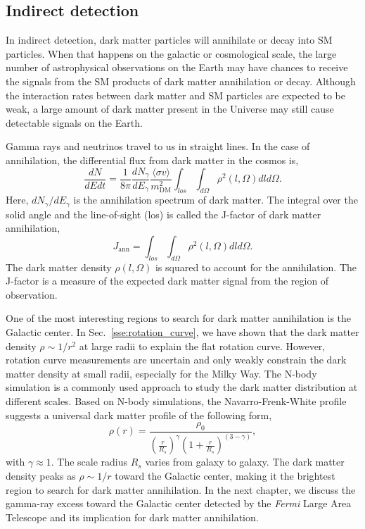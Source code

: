 \documentclass[doublespace,nopageskip]{VTthesis} %
\newcommand{\sigmav}{\langle\sigma v\rangle}
\begin{document}
\subsection{Indirect detection}\label{sse:indirect}

In indirect detection, dark matter particles will annihilate or decay into SM particles. When that happens on the galactic or cosmological scale, the large number of astrophysical observations on the Earth may have chances to receive the signals from the SM products of dark matter annihilation or decay. Although the interaction rates between dark matter and SM particles are expected to be weak, a large amount of dark matter present in the Universe may still cause detectable signals on the Earth.

Gamma rays and neutrinos travel to us in straight lines. In the case of annihilation, the differential flux from dark matter in the cosmos is,
\begin{equation}\label{eq:ann}
    \frac{dN}{dEdt} = \frac{1}{8\pi}\frac{dN_\gamma}{dE_\gamma}\frac{\sigmav}{m_\mathrm{DM}^2}\int_{los}\int_{d\Omega}\rho^2(l,\Omega)dld\Omega.
\end{equation}
Here, $dN_\gamma/dE_\gamma$ is the annihilation spectrum of dark matter. The integral over the solid angle and the line-of-sight (los) is called the J-factor of dark matter annihilation,
\begin{equation}\label{eq:jfactor}
    J_\mathrm{ann} = \int_{los}\int_{d\Omega}\rho^2(l,\Omega)dld\Omega.
\end{equation}
The dark matter density $\rho(l,\Omega)$ is squared to account for the annihilation. The J-factor is a measure of the expected dark matter signal from the region of observation.

One of the most interesting regions to search for dark matter annihilation is the Galactic center. In Sec.~\ref{sse:rotation_curve}, we have shown that the dark matter density $\rho \sim 1/r^2$ at large radii to explain the flat rotation curve. However, rotation curve measurements are uncertain and only weakly constrain the dark matter density at small radii, especially for the Milky Way. The N-body simulation is a commonly used approach to study the dark matter distribution at different scales. Based on N-body simulations, the Navarro-Frenk-White profile~\cite{1996ApJ...462..563N} suggests a universal dark matter profile of the following form,
\begin{equation}
    \rho(r) = \frac{\rho_0}{\left(\frac{r}{R_s}\right)^\gamma\left(1+\frac{r}{R_s}\right)^{(3-\gamma)}},
\end{equation}
with $\gamma\approx 1$. The scale radius $R_s$ varies from galaxy to galaxy. The dark matter density peaks as $\rho \sim 1/r$ toward the Galactic center, making it the brightest region to search for dark matter annihilation. In the next chapter, we discuss the gamma-ray excess toward the Galactic center detected by the \textit{Fermi} Large Area Telescope and its implication for dark matter annihilation.
\end{document}
